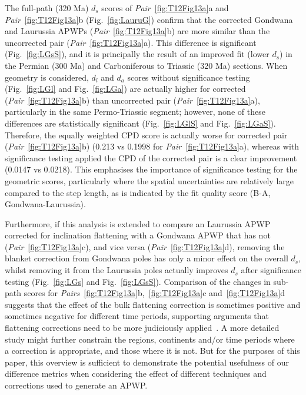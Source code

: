 The full-path (320 Ma) $d_s$ scores of
\emph{Pair}~\ref{fig:T12Fig13a}a and \emph{Pair}~\ref{fig:T12Fig13a}b
(Fig.~\ref{fig:LauruG}) confirm that the corrected Gondwana and Laurussia
APWPs (\emph{Pair}~\ref{fig:T12Fig13a}b) are more similar than the uncorrected
pair (\emph{Pair}~\ref{fig:T12Fig13a}a). This difference is significant
(Fig.~\ref{fig:LGsS}), and it is principally the result of an improved fit
(lower $d_s$) in the Permian (300 Ma) and Carboniferous to
Triassic (320 Ma) sections. When geometry is considered, $d_l$
and $d_a$ scores without significance testing (Fig.~\ref{fig:LGl} and
Fig.~\ref{fig:LGa}) are actually higher for corrected
(\emph{Pair}~\ref{fig:T12Fig13a}b) than uncorrected pair
(\emph{Pair}~\ref{fig:T12Fig13a}a), particularly in the same Permo-Triassic
segment; however, none of these differences are statistically significant
(Fig.~\ref{fig:LGlS} and Fig.~\ref{fig:LGaS}). Therefore, the equally weighted
CPD score is actually worse for corrected pair
(\emph{Pair}~\ref{fig:T12Fig13a}b) (0.213 vs 0.1998 for
\emph{Pair}~\ref{fig:T12Fig13a}a), whereas with significance testing applied the
CPD of the corrected pair is a clear improvement (0.0147 vs 0.0218). This
emphasises the importance of significance testing for the geometric scores,
particularly where the spatial uncertainties are relatively large compared to
the step length, as is indicated by the fit quality score (B-A,
Gondwana-Laurussia).

Furthermore, if this analysis is extended to compare an Laurussia APWP corrected
for inclination flattening with a Gondwana APWP that has not
(\emph{Pair}~\ref{fig:T12Fig13a}c), and vice versa
(\emph{Pair}~\ref{fig:T12Fig13a}d), removing the blanket correction from
Gondwana poles has only a minor effect on the overall $d_s$, whilst removing it
from the Laurussia poles actually improves $d_s$ after significance testing
(Fig.~\ref{fig:LGs} and Fig.~\ref{fig:LGsS}). Comparison of the changes in
sub-path scores for \emph{Pairs}~\ref{fig:T12Fig13a}b,~\ref{fig:T12Fig13a}c
and~\ref{fig:T12Fig13a}d suggests that the effect of the bulk flattening
correction is sometimes positive and sometimes negative for different time
periods, supporting arguments that flattening corrections need to be more
judiciously applied~\cite[for example]{B10,B16}. A more detailed study might
further constrain the regions, continents and/or time periods where a correction
is appropriate, and those where it is not. But for the purposes of this paper,
this overview is sufficient to demonstrate the potential usefulness of our
difference metrics when considering the effect of different techniques and
corrections used to generate an APWP\@.

